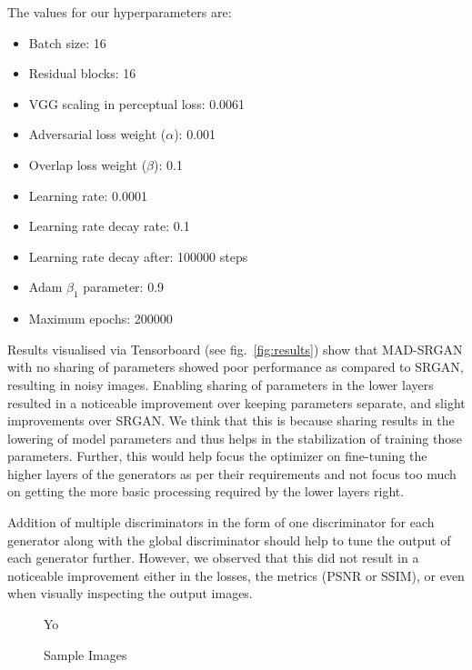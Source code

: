 \documentclass[12pt,a4paper,twocolumn]{article}
\begin{document}
        The values for our hyperparameters are:
        \begin{itemize}
            \item Batch size: 16
            \item Residual blocks: 16
            \item VGG scaling in perceptual loss: 0.0061
            \item Adversarial loss weight ($\alpha$): 0.001
            \item Overlap loss weight ($\beta$): 0.1
            \item Learning rate: 0.0001
            \item Learning rate decay rate: 0.1
            \item Learning rate decay after: 100000 steps
            \item Adam $\beta_1$ parameter: 0.9
            \item Maximum epochs: 200000
        \end{itemize}

        Results visualised via Tensorboard \cite{tensorflow} (see fig.~\ref{fig:results}) show that MAD-SRGAN with no sharing of parameters showed poor performance as compared to SRGAN, resulting in noisy images.
        Enabling sharing of parameters in the lower layers resulted in a noticeable improvement over keeping parameters separate, and slight improvements over SRGAN.
        We think that this is because sharing results in the lowering of model parameters and thus helps in the stabilization of training those parameters.
        Further, this would help focus the optimizer on fine-tuning the higher layers of the generators as per their requirements and not focus too much on getting the more basic processing required by the lower layers right.

        Addition of multiple discriminators in the form of one discriminator for each generator along with the global discriminator should help to tune the output of each generator further.
        However, we observed that this did not result in a noticeable improvement either in the losses, the metrics (PSNR or SSIM), or even when visually inspecting the output images.

        \begin{figure}
            \centering
            Yo
            \caption{Sample Images}
            \label{fig:samples}
        \end{figure}

    
    
\end{document}
